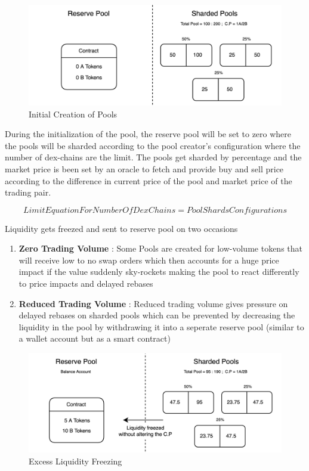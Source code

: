 \documentclass[10pt]{article}
\begin{document}
\begin{figure}[H]
\begin{center}
\includegraphics[width=13cm]{reserve-pool-1}
\caption{Initial Creation of Pools}
\end{center}
\end{figure}

During the initialization of the pool, the reserve pool will be set to zero where the pools will be sharded according to the pool creator's configuration where the number of dex-chains are the limit. The pools get sharded by percentage and the market price is been set by an oracle to fetch and provide buy and sell price according to the difference in current price of the pool and market price of the trading pair.

\begin{equation}
Limit Equation For Number Of Dex Chains = Pool Shards Configurations
\end{equation}

Liquidity gets freezed and sent to reserve pool on two occasions
\begin{enumerate}[leftmargin=+0.2in]
\item \textbf{Zero Trading Volume} : Some Pools are created for low-volume tokens that will receive low to no swap orders which then accounts for a huge price impact if the value suddenly sky-rockets making the pool to react differently to price impacts and delayed rebases
\item \textbf{Reduced Trading Volume} : Reduced trading volume gives pressure on delayed rebases on sharded pools which can be prevented by decreasing the liquidity in the pool by withdrawing it into a seperate reserve pool (similar to a wallet account but as a smart contract) 
\end{enumerate}

\begin{figure}[H]
\begin{center}
\includegraphics[width=13cm]{reserve-pool-2}
\caption{Excess Liquidity Freezing}
\end{center}
\end{figure}
\end{document}
